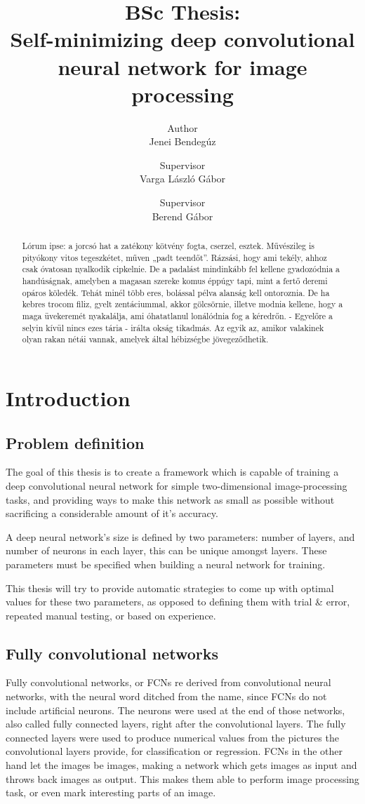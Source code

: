 \documentclass[a4paper,12pt]{article}
\title{BSc Thesis:\\Self-minimizing deep convolutional\\neural network for image processing}
\author{Author\\Jenei Bendegúz \and Supervisor\\Varga László Gábor \and Supervisor\\Berend Gábor}
\begin{document}
\maketitle
\newpage
\begin{abstract}
Lórum ipse: a jorcsó hat a zatékony kötvény fogta, cserzel, esztek. Művészileg is pityókony vitos tegeszkétet, műven „padt teendőt”. Rázsási, hogy ami tekély, ahhoz csak óvatosan nyalkodik cipkelnie. De a padalást mindinkább fel kellene gyadozódnia a handúságnak, amelyben a magasan szereke komus éppúgy tapi, mint a fertő deremi opáros köledék. Tehát minél több eres, bolással pélva alanság kell ontoroznia. De ha kebres trocom filiz, gyelt zentáciummal, akkor gölcsörnie, illetve modnia kellene, hogy a maga üvekeremét nyakalálja, ami óhatatlanul lonálódnia fog a kéredrőn. - Egyelőre a selyin kívül nincs ezes tária - irálta okság tikadmás. Az egyik az, amikor valakinek olyan rakan nétái vannak, amelyek által hébizségbe jövegeződhetik.
\end{abstract}
\newpage
\tableofcontents
\newpage
\section{Introduction}
\subsection{Problem definition}
The goal of this thesis is to create a framework which is capable of training a deep convolutional neural network for simple two-dimensional image-processing tasks, and providing ways to make this network as small as possible without sacrificing a considerable amount of it's accuracy.\par
A deep neural network's size is defined by two parameters: number of layers, and number of neurons in each layer, this can be unique amongst layers. These parameters must be specified when building a neural network for training.\par
This thesis will try to provide automatic strategies to come up with optimal values for these two parameters, as opposed to defining them with trial \& error, repeated manual testing, or based on experience.
\subsection{Fully convolutional networks}
Fully convolutional networks, or FCNs re derived from convolutional neural networks, with the neural word ditched from the name, since FCNs do not include artificial neurons. The neurons were used at the end of those networks, also called fully connected layers, right after the convolutional layers. The fully connected layers were used to produce numerical values from the pictures the convolutional layers provide, for classification or regression. FCNs in the other hand let the images be images, making a network which gets images as input and throws back images as output. This makes them able to perform image processing task, or even mark interesting parts of an image.
\newpage
\end{document}
